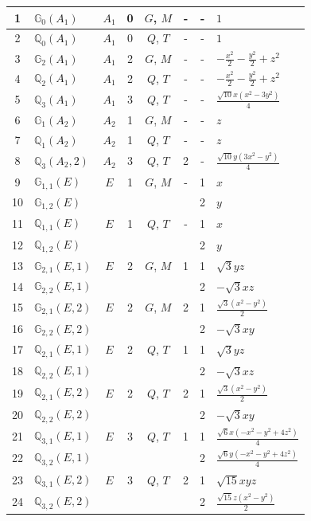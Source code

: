 \documentclass[fleqn,10pt,landscape]{jsarticle}
\begin{document}
\begin{longtable}[l]{clcccccl}
1 & $\mathbb{G}_{0}(A_{1})$ & $A_{1}$ & 0 & $G$, $M$ & - & - & $1$ \\ \hline
2 & $\mathbb{Q}_{0}(A_{1})$ & $A_{1}$ & 0 & $Q$, $T$ & - & - & $1$ \\ \hline
3 & $\mathbb{G}_{2}(A_{1})$ & $A_{1}$ & 2 & $G$, $M$ & - & - & $- \frac{x^{2}}{2} - \frac{y^{2}}{2} + z^{2}$ \\ \hline
4 & $\mathbb{Q}_{2}(A_{1})$ & $A_{1}$ & 2 & $Q$, $T$ & - & - & $- \frac{x^{2}}{2} - \frac{y^{2}}{2} + z^{2}$ \\ \hline
5 & $\mathbb{Q}_{3}(A_{1})$ & $A_{1}$ & 3 & $Q$, $T$ & - & - & $\frac{\sqrt{10} x \left(x^{2} - 3 y^{2}\right)}{4}$ \\ \hline
6 & $\mathbb{G}_{1}(A_{2})$ & $A_{2}$ & 1 & $G$, $M$ & - & - & $z$ \\ \hline
7 & $\mathbb{Q}_{1}(A_{2})$ & $A_{2}$ & 1 & $Q$, $T$ & - & - & $z$ \\ \hline
8 & $\mathbb{Q}_{3}(A_{2},2)$ & $A_{2}$ & 3 & $Q$, $T$ & 2 & - & $\frac{\sqrt{10} y \left(3 x^{2} - y^{2}\right)}{4}$ \\ \hline
9 & $\mathbb{G}_{1,1}(E)$ & $E$ & 1 & $G$, $M$ & - & 1 & $x$ \\
10 & $\mathbb{G}_{1,2}(E)$ &  &  &  &  & 2 & $y$ \\ \hline
11 & $\mathbb{Q}_{1,1}(E)$ & $E$ & 1 & $Q$, $T$ & - & 1 & $x$ \\
12 & $\mathbb{Q}_{1,2}(E)$ &  &  &  &  & 2 & $y$ \\ \hline
13 & $\mathbb{G}_{2,1}(E,1)$ & $E$ & 2 & $G$, $M$ & 1 & 1 & $\sqrt{3} y z$ \\
14 & $\mathbb{G}_{2,2}(E,1)$ &  &  &  &  & 2 & $- \sqrt{3} x z$ \\ \hline
15 & $\mathbb{G}_{2,1}(E,2)$ & $E$ & 2 & $G$, $M$ & 2 & 1 & $\frac{\sqrt{3} \left(x^{2} - y^{2}\right)}{2}$ \\
16 & $\mathbb{G}_{2,2}(E,2)$ &  &  &  &  & 2 & $- \sqrt{3} x y$ \\ \hline
17 & $\mathbb{Q}_{2,1}(E,1)$ & $E$ & 2 & $Q$, $T$ & 1 & 1 & $\sqrt{3} y z$ \\
18 & $\mathbb{Q}_{2,2}(E,1)$ &  &  &  &  & 2 & $- \sqrt{3} x z$ \\ \hline
19 & $\mathbb{Q}_{2,1}(E,2)$ & $E$ & 2 & $Q$, $T$ & 2 & 1 & $\frac{\sqrt{3} \left(x^{2} - y^{2}\right)}{2}$ \\
20 & $\mathbb{Q}_{2,2}(E,2)$ &  &  &  &  & 2 & $- \sqrt{3} x y$ \\ \hline
21 & $\mathbb{Q}_{3,1}(E,1)$ & $E$ & 3 & $Q$, $T$ & 1 & 1 & $\frac{\sqrt{6} x \left(- x^{2} - y^{2} + 4 z^{2}\right)}{4}$ \\
22 & $\mathbb{Q}_{3,2}(E,1)$ &  &  &  &  & 2 & $\frac{\sqrt{6} y \left(- x^{2} - y^{2} + 4 z^{2}\right)}{4}$ \\ \hline
23 & $\mathbb{Q}_{3,1}(E,2)$ & $E$ & 3 & $Q$, $T$ & 2 & 1 & $\sqrt{15} x y z$ \\
24 & $\mathbb{Q}_{3,2}(E,2)$ &  &  &  &  & 2 & $\frac{\sqrt{15} z \left(x^{2} - y^{2}\right)}{2}$ \\
\end{longtable}
\end{document}
